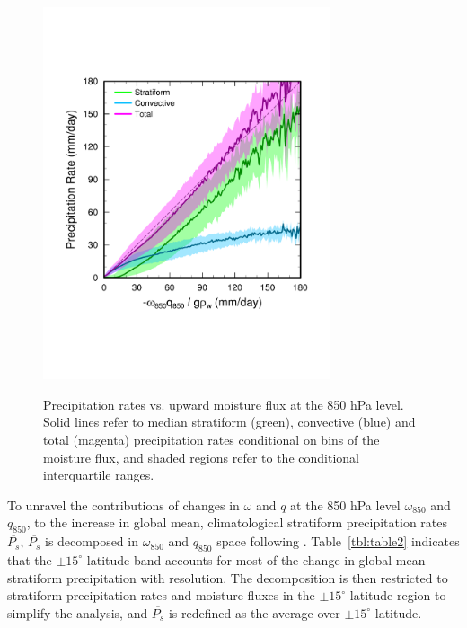 \documentclass[times]{qjrms4}
\begin{document}
\begin{figure}
\begin{center}
\noindent\includegraphics[width=20pc,angle=0]{figs/temp_mflux.pdf}\\
\end{center}
\caption{Precipitation rates vs. upward moisture flux at the 850 hPa level. Solid lines refer to median stratiform (green), convective (blue) and total (magenta) precipitation rates conditional on bins of the moisture flux, and shaded regions refer to the conditional interquartile ranges.}
\label{fig:mflux}
\end{figure}

To unravel the contributions of changes in $\omega$ and $q$ at the 850 hPa level $\omega_{850}$ and $q_{850}$, to the increase in global mean, climatological stratiform precipitation rates $\overline{P_s}$, $\overline{P_s}$ is decomposed in $\omega_{850}$ and $q_{850}$ space following \cite{TETAL2018CD}. Table~\ref{tbl:table2} indicates that the $\pm 15^{\circ}$ latitude band accounts for most of the change in global mean stratiform precipitation with resolution. The decomposition is then restricted to stratiform precipitation rates and moisture fluxes in the $\pm 15^{\circ}$ latitude region to simplify the analysis, and $\overline{P_s}$ is redefined as the average over $\pm 15^{\circ}$ latitude. 
\end{document}
